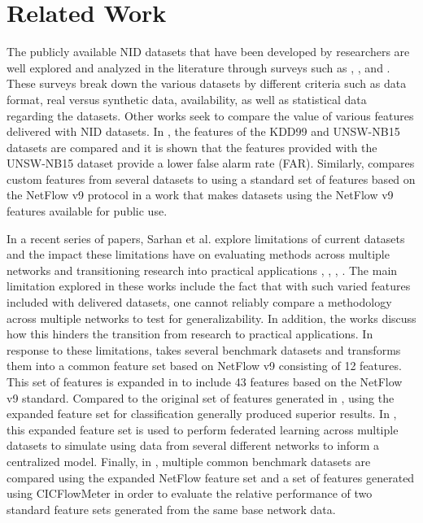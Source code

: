 \documentclass[conference]{IEEEtran}
\begin{document}
\section{Related Work}\label{sec:related_work}

The publicly available NID datasets that have been developed by researchers are well explored and analyzed in the literature through surveys such as \cite{Chou2022}, \cite{yang2022systematic}, and \cite{ring2019survey}.
These surveys break down the various datasets by different criteria such as data format, real versus synthetic data, availability, as well as statistical data regarding the datasets.
Other works seek to compare the value of various features delivered with NID datasets.
In \cite{7809531}, the features of the KDD99 \cite{kdd99} and UNSW-NB15 \cite{unswnb15} datasets are compared and it is shown that the features provided with the UNSW-NB15 dataset provide a lower false alarm rate (FAR).
Similarly, \cite{sarhan2020netflow} compares custom features from several datasets to using a standard set of features based on the NetFlow v9 protocol \cite{netflowv9format} in a work that makes datasets using the NetFlow v9 features available for public use.

In a recent series of papers, Sarhan et al. explore limitations of current datasets and the impact these limitations have on evaluating methods across multiple networks and transitioning research into practical applications \cite{sarhan2020netflow}, \cite{sarhan2021cyber}, \cite{Sarhan2021}, \cite{sarhan_arxiv2021}.
The main limitation explored in these works include the fact that with such varied features included with delivered datasets, one cannot reliably compare a methodology across multiple networks to test for generalizability.
In addition, the works discuss how this hinders the transition from research to practical applications. 
In response to these limitations, \cite{sarhan2020netflow} takes several benchmark datasets and transforms them into a common feature set based on NetFlow v9 consisting of 12 features.
This set of features is expanded in \cite{Sarhan2021} to include 43 features based on the NetFlow v9 standard.
Compared to the original set of features generated in \cite{sarhan2020netflow}, using the expanded feature set for classification generally produced superior results.
In \cite{sarhan2021cyber}, this expanded feature set is used to perform federated learning across multiple datasets to simulate using data from several different networks to inform a centralized model.
Finally, in \cite{sarhan_arxiv2021}, multiple common benchmark datasets are compared using the expanded NetFlow feature set and a set of features generated using CICFlowMeter \cite{lashkari2017characterization} in order to evaluate the relative performance of two standard feature sets generated from the same base network data.
\end{document}
